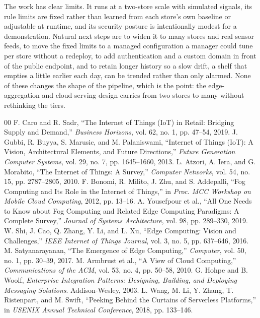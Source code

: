 \documentclass[conference]{IEEEtran}
\begin{document}
The work has clear limits. It runs at a two-store scale with simulated signals, its rule limits are fixed rather than learned from each store's own baseline or adjustable at runtime, and its security posture is intentionally modest for a demonstration. Natural next steps are to widen it to many stores and real sensor feeds, to move the fixed limits to a managed configuration a manager could tune per store without a redeploy, to add authentication and a custom domain in front of the public endpoint, and to retain longer history so a slow drift, a shelf that empties a little earlier each day, can be trended rather than only alarmed. None of these changes the shape of the pipeline, which is the point: the edge-aggregation and cloud-serving design carries from two stores to many without rethinking the tiers.

\begin{thebibliography}{00}
 F. Caro and R. Sadr, ``The Internet of Things (IoT) in Retail: Bridging Supply and Demand,'' \emph{Business Horizons}, vol. 62, no. 1, pp. 47--54, 2019.
 J. Gubbi, R. Buyya, S. Marusic, and M. Palaniswami, ``Internet of Things (IoT): A Vision, Architectural Elements, and Future Directions,'' \emph{Future Generation Computer Systems}, vol. 29, no. 7, pp. 1645--1660, 2013.
 L. Atzori, A. Iera, and G. Morabito, ``The Internet of Things: A Survey,'' \emph{Computer Networks}, vol. 54, no. 15, pp. 2787--2805, 2010.
 F. Bonomi, R. Milito, J. Zhu, and S. Addepalli, ``Fog Computing and Its Role in the Internet of Things,'' in \emph{Proc. MCC Workshop on Mobile Cloud Computing}, 2012, pp. 13--16.
 A. Yousefpour et al., ``All One Needs to Know about Fog Computing and Related Edge Computing Paradigms: A Complete Survey,'' \emph{Journal of Systems Architecture}, vol. 98, pp. 289--330, 2019.
 W. Shi, J. Cao, Q. Zhang, Y. Li, and L. Xu, ``Edge Computing: Vision and Challenges,'' \emph{IEEE Internet of Things Journal}, vol. 3, no. 5, pp. 637--646, 2016.
 M. Satyanarayanan, ``The Emergence of Edge Computing,'' \emph{Computer}, vol. 50, no. 1, pp. 30--39, 2017.
 M. Armbrust et al., ``A View of Cloud Computing,'' \emph{Communications of the ACM}, vol. 53, no. 4, pp. 50--58, 2010.
 G. Hohpe and B. Woolf, \emph{Enterprise Integration Patterns: Designing, Building, and Deploying Messaging Solutions}. Addison-Wesley, 2003.
 L. Wang, M. Li, Y. Zhang, T. Ristenpart, and M. Swift, ``Peeking Behind the Curtains of Serverless Platforms,'' in \emph{USENIX Annual Technical Conference}, 2018, pp. 133--146.

\end{thebibliography}
\end{document}
